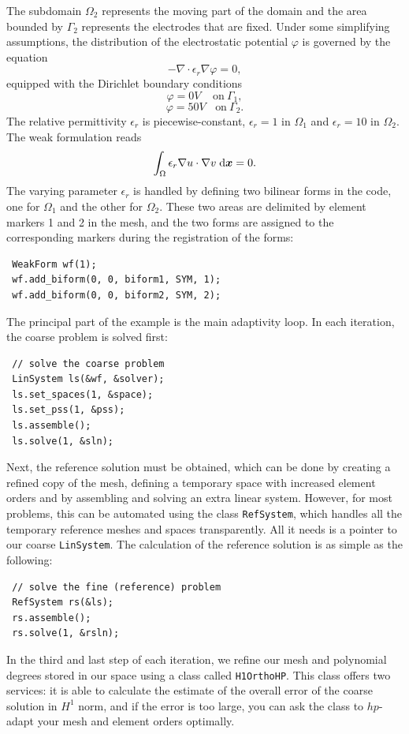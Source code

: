 The subdomain $\Omega_2$ represents the moving part of the domain and the area bounded by $\Gamma_2$
represents the electrodes that are fixed. Under some simplifying assumptions, the distribution
of the electrostatic potential $\varphi$ is governed by the equation 
$$-\nabla\cdot\epsilon_r\nabla\varphi = 0,$$
equipped with the Dirichlet boundary conditions
$$\varphi = 0 V \ \ \ \ \ \mbox{on}\ \Gamma_1,$$
$$\varphi = 50 V \ \ \ \ \mbox{on}\ \Gamma_2.$$
The relative permittivity $\epsilon_r$ is piecewise-constant, $\epsilon_r = 1$ in $\Omega_1$ and 
$\epsilon_r = 10$ in $\Omega_2$. The weak formulation reads
$$\int_\Omega \epsilon_r \nabla u \cdot \nabla v \;\mbox{d}\mbox{\boldmath $x$} = 0.$$
The varying parameter $\epsilon_r$ is handled by defining two bilinear forms in the code, one for
$\Omega_1$ and the other for $\Omega_2$. These two areas are delimited by element markers 1 and 2 in
the mesh, and the two forms are assigned to the corresponding markers during the registration of
the forms:
\begin{lstlisting}
 WeakForm wf(1);
 wf.add_biform(0, 0, biform1, SYM, 1);
 wf.add_biform(0, 0, biform2, SYM, 2);
\end{lstlisting}

The principal part of the example is the main adaptivity loop. In each iteration, the coarse problem
is solved first:
\begin{lstlisting}
 // solve the coarse problem
 LinSystem ls(&wf, &solver);
 ls.set_spaces(1, &space);
 ls.set_pss(1, &pss);
 ls.assemble();
 ls.solve(1, &sln);
\end{lstlisting}

Next, the reference solution must be obtained, which can be done by creating a refined copy of the mesh,
defining a temporary space with increased element orders and by assembling and solving an extra
linear system. However, for most problems, this can be automated using the class {\tt RefSystem}, which 
handles all the temporary reference meshes and spaces transparently. All it needs is a pointer to our coarse 
{\tt LinSystem}. The calculation of the reference solution is as simple as the following:
\begin{lstlisting}
 // solve the fine (reference) problem
 RefSystem rs(&ls);
 rs.assemble();
 rs.solve(1, &rsln);
\end{lstlisting}

In the third and last step of each iteration, we refine our mesh and polynomial degrees stored
in our space using a class called {\tt H1OrthoHP}. This class offers two services: it is able to
calculate  the estimate of the overall error of the coarse solution in $H^1$ norm, and if the
error is too large, you can ask the class to $hp$-adapt your mesh and element orders optimally.


